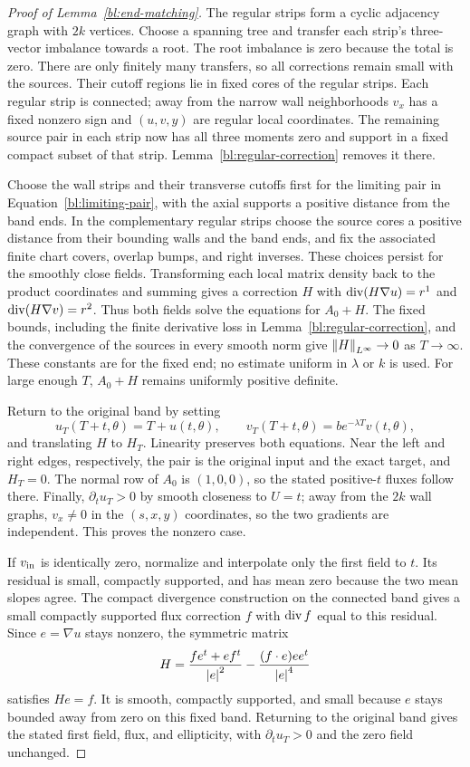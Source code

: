 \begin{proof}[Proof of Lemma~\ref{bl:end-matching}]
The regular strips form a cyclic adjacency graph with $2k$ vertices.
Choose a spanning tree and transfer each strip's three-vector imbalance
towards a root.  The root imbalance is zero because the total is zero.
There are only finitely many transfers, so all corrections remain small
with the sources.  Their cutoff regions lie in fixed cores of the
regular strips.  Each regular strip is connected; away from the narrow
wall neighborhoods $v_x$ has a fixed nonzero sign and $(u,v,y)$ are
regular local coordinates.  The remaining source pair in each strip
now has all three moments zero and support in a fixed compact subset
of that strip.  Lemma~\ref{bl:regular-correction} removes it there.

Choose the wall strips and their transverse cutoffs first for the
limiting pair in Equation~\eqref{bl:limiting-pair}, with the axial
supports a positive distance from the band ends.  In the complementary
regular strips choose the source cores a positive distance from their
bounding walls and the band ends, and fix the associated finite chart
covers, overlap bumps, and right inverses.  These choices persist for
the smoothly close fields.  Transforming each local matrix density
back to the product coordinates and summing gives a correction $H$
with $\operatorname{div}(H\nabla u)=r^1$ and $\operatorname{div}(H\nabla v)=r^2$.  Thus both fields
solve the equations for $A_0+H$.  The fixed bounds, including the
finite derivative loss in Lemma~\ref{bl:regular-correction}, and the
convergence of the sources in every smooth norm give
$\left\lVert H\right\rVert_{L^\infty}\to0$ as $T\to\infty$.  These constants are for the fixed
end; no estimate uniform in $\lambda$ or $k$ is used.  For large enough
$T$, $A_0+H$ remains uniformly positive definite.

Return to the original band by setting
\[
 u_T(T+t,\theta)=T+u(t,\theta),\qquad
 v_T(T+t,\theta)=b e^{-\lambda T}v(t,\theta),
\]
and translating $H$ to $H_T$.  Linearity preserves both equations.
Near the left and right edges, respectively, the pair is the original
input and the exact target, and $H_T=0$.  The normal row of $A_0$ is
$(1,0,0)$, so the stated positive-$t$ fluxes follow there.  Finally,
$\partial_tu_T>0$ by smooth closeness to $U=t$; away from the $2k$
wall graphs, $v_x\ne0$ in the $(s,x,y)$ coordinates, so the two
gradients are independent.  This proves the nonzero case.

If $v_{\rm in}$ is identically zero, normalize and interpolate only
the first field to $t$.  Its residual is small, compactly supported,
and has mean zero because the two mean slopes agree.
The compact divergence construction on the connected band gives a small
compactly supported flux correction $f$ with $\operatorname{div} f$ equal to this
residual.  Since $e=\nabla u$ stays nonzero, the symmetric
matrix
\[
 H=\frac{fe^t+ef^t}{\left\lvert e\right\rvert^2}
       -\frac{(f\cdot e)ee^t}{\left\lvert e\right\rvert^4}
\]
satisfies $He=f$.  It is smooth, compactly supported, and small because
$e$ stays bounded away from zero on this fixed band.  Returning to the
original band gives the stated first field, flux, and ellipticity, with
$\partial_tu_T>0$ and the zero field unchanged.
\end{proof}

